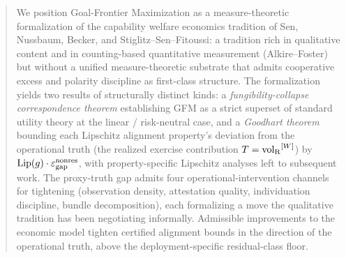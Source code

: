 \begin{abstract}
We position Goal-Frontier Maximization as a measure-theoretic formalization of
    the capability welfare economics tradition of Sen, Nussbaum, Becker, and
    Stiglitz--Sen--Fitoussi: a tradition rich in qualitative content and in
    counting-based quantitative measurement (Alkire--Foster) but without a
    unified measure-theoretic substrate that admits cooperative excess and
    polarity discipline as first-class structure.  The formalization yields two results of
    structurally distinct kinds: a \emph{fungibility-collapse correspondence
    theorem} establishing GFM as a strict superset of standard utility theory
    at the linear / risk-neutral case, and a \emph{Goodhart theorem} bounding
    each Lipschitz alignment property's deviation from the operational truth
    (the realized exercise contribution $T = \volRwin$) by $\mathrm{Lip}(g)
    \cdot \epsnonres$, with property-specific Lipschitz analyses left to
    subsequent work.  The proxy-truth gap admits four
    operational-intervention channels for tightening (observation density,
    attestation quality, individuation discipline, bundle decomposition),
    each formalizing a move the qualitative tradition has been negotiating
    informally.  Admissible improvements to the economic
    model tighten certified alignment bounds in the direction of the
    operational truth, above the deployment-specific residual-class floor.
\end{abstract}

